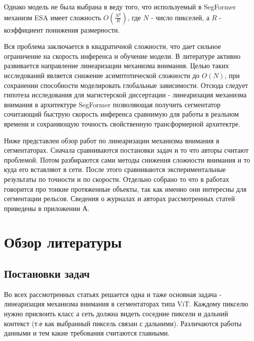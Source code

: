 \documentclass[areasetadvanced]{scrartcl}
\begin{document}
	Однако модель не была выбрана в веду того, что используемый в SegFormer механизм ESA имеет сложность $O(\frac{N^2}{R})$, где $N$ - число пикселей, а $R$ - коэффициент понижения размерности.

	Вся проблема заключается в квадратичной сложности, что дает сильное ограничение на скорость инференса и обучение модели.
	В литературе активно развивается направление линеаризации механизма внимания. Целью таких исследований является снижение асимптотической сложности до $O(N)$,
	при сохранении способности моделировать глобальные зависимости. Отсюда следует гипотеза исследования для магистерской диссертации - линеаризация механизма внимания в архитектуре 
	SegFormer позволяющая получить сегментатор сочитающий быструю скорость инференса сравнимую для работы в реальном времени и сохраняющую точность свойственную трансформерной архитектре.
	
	Ниже представлен обзор работ по линеаризации механизма внимания в сегментаторах.
	Сначала сравниваются постановки задач и то что авторы считают проблемой. Потом разбираются сами методы снижения сложности внимания и то
	куда его вставляют в сети. После этого сравниваются экспериментальные результаты по точности и по скорости. Отдельно собрано то что
	в работах говорится про тонкие протяженные объекты, так как именно они интересны для сегментации рельсов. Сведения о журналах и авторах
	рассмотренных статей приведены в приложении А.

	\newpage
	\section{Обзор литературы}
	\subsection{Постановки задач}
		Во всех рассмотренных статьях решается одна и таже основная задача - линеаризация 
		механизма внимания в сегментаторах типа ViT. Каждому пикселю нужно присвоить класс а сеть должна видеть
		соседние пиксели и дальний контекст (т.е как выбранный пиксель связан с дальними). 
		Различаются работы данными и тем какие требования считаются главными.
\end{document}

